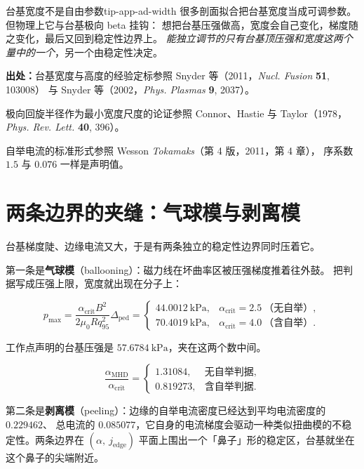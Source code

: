 \begin{tip}{台基宽度不是自由参数}{tip-app-ad-width}
很多剖面拟合把台基宽度当成可调参数。但物理上它与台基极向 beta 挂钩：
想把台基压强做高，宽度会自己变化，梯度随之变化，最后又回到稳定性边界上。
\emph{能独立调节的只有台基顶压强和宽度这两个量中的一个}，另一个由稳定性决定。
\end{tip}

{\footnotesize
\textbf{出处：}台基宽度与高度的经验定标参照 Snyder 等（2011，\emph{Nucl. Fusion} \textbf{51}, 103008）
与 Snyder 等（2002，\emph{Phys. Plasmas} \textbf{9}, 2037）。

极向回旋半径作为最小宽度尺度的论证参照
Connor、Hastie 与 Taylor（1978，\emph{Phys. Rev. Lett.} \textbf{40}, 396）。

自举电流的标准形式参照 Wesson \emph{Tokamaks}（第 4 版，2011，第 4 章），
序系数 $1.5$ 与 $0.076$ 一样是声明值。
}

\section{两条边界的夹缝：气球模与剥离模}
\label{sec:app-ad-limits}

台基梯度陡、边缘电流又大，于是有两条独立的稳定性边界同时压着它。

第一条是\textbf{气球模}（ballooning）：磁力线在坏曲率区被压强梯度推着往外鼓。
把判据写成压强上限，宽度就出现在分子上：

\begin{equation}
p_{\max}=\frac{\alpha_{\mathrm{crit}}B^2}{2\mu_0Rq_{95}^2}\Delta_{\mathrm{ped}}
=\begin{cases}
44.0012\ \mathrm{kPa}, & \alpha_{\mathrm{crit}}=2.5\ \text{（无自举）},\\
70.4019\ \mathrm{kPa}, & \alpha_{\mathrm{crit}}=4.0\ \text{（含自举）}.
\end{cases}
\label{eq:app-ad-pmax}
\end{equation}

工作点声明的台基压强是 $57.6784\ \mathrm{kPa}$，夹在这两个数中间。

\begin{equation}
\frac{\alpha_{\mathrm{MHD}}}{\alpha_{\mathrm{crit}}}
=\begin{cases}
1.31084, & \text{无自举判据},\\
0.819273, & \text{含自举判据}.
\end{cases}
\label{eq:app-ad-margin}
\end{equation}

第二条是\textbf{剥离模}（peeling）：边缘的自举电流密度已经达到平均电流密度的 $0.229462$、
总电流的 $0.085077$，它自身的电流梯度会驱动一种类似扭曲模的不稳定性。两条边界在
$(\alpha,\ j_{\mathrm{edge}})$ 平面上围出一个「鼻子」形的稳定区，台基就坐在这个鼻子的尖端附近。

